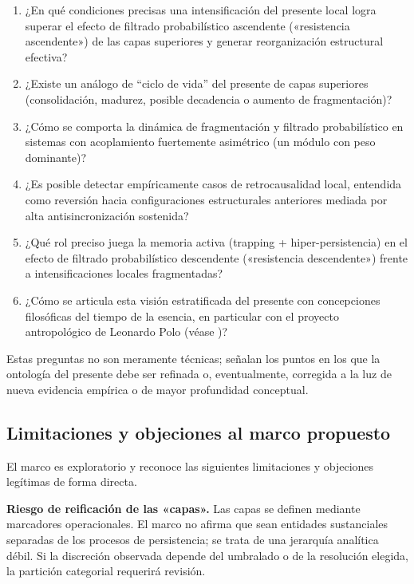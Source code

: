 \begin{enumerate}
    \item ¿En qué condiciones precisas una intensificación del presente local logra superar el efecto de filtrado probabilístico ascendente («resistencia ascendente») de las capas superiores y generar reorganización estructural efectiva?
    
    \item ¿Existe un análogo de ``ciclo de vida'' del presente de capas superiores (consolidación, madurez, posible decadencia o aumento de fragmentación)?
    
    \item ¿Cómo se comporta la dinámica de fragmentación y filtrado probabilístico en sistemas con acoplamiento fuertemente asimétrico (un módulo con peso dominante)?
    
    \item ¿Es posible detectar empíricamente casos de retrocausalidad local, entendida como reversión hacia configuraciones estructurales anteriores mediada por alta antisincronización sostenida?
    
    \item ¿Qué rol preciso juega la memoria activa (trapping + hiper-persistencia) en el efecto de filtrado probabilístico descendente («resistencia descendente») frente a intensificaciones locales fragmentadas?
    
    \item ¿Cómo se articula esta visión estratificada del presente con concepciones filosóficas del tiempo de la esencia, en particular con el proyecto antropológico de Leonardo Polo (véase \citep{polo_antropologia_trascendental,padilla_polo_dialogue_2026})?
\end{enumerate}

Estas preguntas no son meramente técnicas; señalan los puntos en los que la ontología del presente debe ser refinada o, eventualmente, corregida a la luz de nueva evidencia empírica o de mayor profundidad conceptual.

\subsection{Limitaciones y objeciones al marco propuesto}

El marco es exploratorio y reconoce las siguientes limitaciones y objeciones legítimas de forma directa.

\textbf{Riesgo de reificación de las «capas».} Las capas se definen mediante marcadores operacionales. El marco no afirma que sean entidades sustanciales separadas de los procesos de persistencia; se trata de una jerarquía analítica débil. Si la discreción observada depende del umbralado o de la resolución elegida, la partición categorial requerirá revisión.

